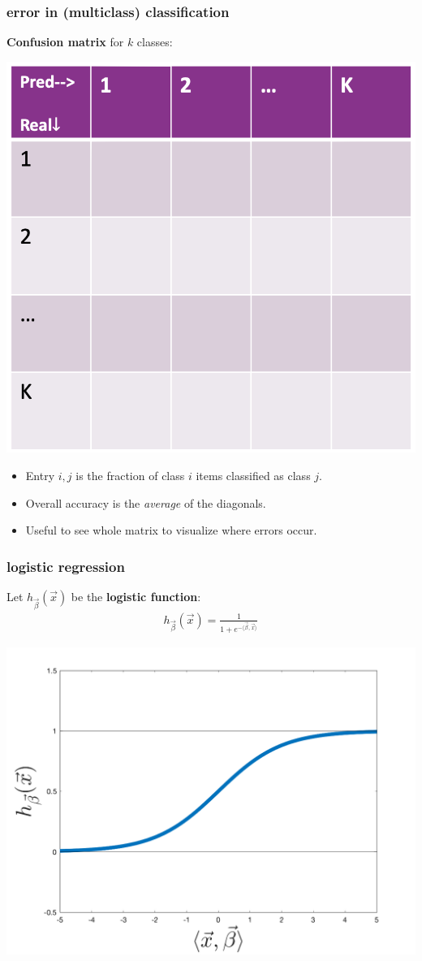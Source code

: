 \documentclass[handout,compress]{beamer}
\begin{document}
\begin{frame}
	\frametitle{error in (multiclass) classification}
	\textbf{Confusion matrix} for $k$ classes:
	\begin{center}
		\includegraphics[width=.45\textwidth]{confusion_matrix.png}
	\end{center}
	\begin{itemize}
		\small
		\item Entry $i,j$ is the fraction of class $i$ items classified as class $j$.
		\item Overall accuracy is the \emph{average} of the diagonals.
		\item Useful to see whole matrix to visualize where errors occur.
	\end{itemize}
\end{frame}

\begin{frame}[t]
	\frametitle{logistic regression}
	Let $h_{\vec{\beta}}(\vec{x})$ be the \textbf{\alert{logistic function}}:
	\begin{align*}
	h_{\vec{\beta}}(\vec{x}) = \frac{1}{1 + e^{-\langle\vec{\beta},\vec{x}\rangle}}
	\end{align*}
	\begin{center}
		\includegraphics[width=.6\textwidth]{logistic_function.png}
	\end{center}
\end{frame}
\end{document}
